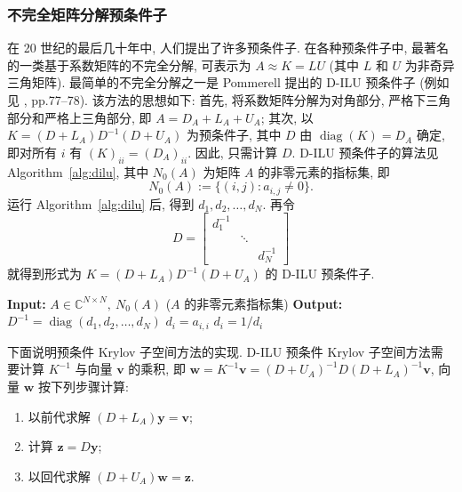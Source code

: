 \subsubsection{{不完全矩阵分解预条件子}}\label{subsec:incomplete-decomposition-preconditioners}
{在 20 世纪的最后几十年中, 人们提出了许多预条件子. 在各种预条件子中, 最著名的一类基于系数矩阵的不完全分解, 可表示为 $A\approx K=LU$ (其中 $L$ 和 $U$ 为非奇异三角矩阵).}
{最简单的不完全分解之一是 Pommerell 提出的 D-ILU 预条件子 (例如见 , pp.77--78). 该方法的思想如下: 首先, 将系数矩阵分解为对角部分, 严格下三角部分和严格上三角部分, 即 $A=D_A+L_A+U_A$; 其次, 以 $K=(D+L_A)D^{-1}(D+U_A)$ 为预条件子, 其中 $D$ 由 $\operatorname{diag}(K)=D_A$ 确定, 即对所有 $i$ 有 $(K)_{ii}=(D_A)_{ii}$. 因此, 只需计算 $D$.}
{D-ILU 预条件子的算法见 Algorithm\ \ref{alg:dilu}, 其中 $N_0(A)$ 为矩阵 $A$ 的非零元素的指标集, 即}
\[N_0(A):=\{(i,j):a_{i,j}\ne0\}.\]
{运行 Algorithm\ \ref{alg:dilu} 后, 得到 $d_1,d_2,\ldots,d_N$. 再令}
\[D=\begin{bmatrix}d_1^{-1}&&\\&\ddots&\\&&d_N^{-1}\end{bmatrix}\]
{就得到形式为 $K=(D+L_A)D^{-1}(D+U_A)$ 的 D-ILU 预条件子.}
\begin{algorithm}[H]\caption{{D-ILU 分解}}\label{alg:dilu}\begin{algorithmic}[1]
\Statex\textbf{Input:} $A\in\mathbb C^{N\times N},\ N_0(A)$ {($A$ 的非零元素指标集)}
\Statex\textbf{Output:} $D^{-1}=\operatorname{diag}(d_1,d_2,\ldots,d_N)$
\State $d_i=a_{i,i}$
\EndFor
{}
\State $d_i=1/d_i$
\EndFor\EndFor\end{algorithmic}\end{algorithm}
{\leavevmode{}\label{idx:chapter-03-section-05:dilu-implementation}下面说明预条件 Krylov 子空间方法的实现. D-ILU 预条件 Krylov 子空间方法需要计算 $K^{-1}$ 与向量 $\bm v$ 的乘积, 即 $\bm w=K^{-1}\bm v=(D+U_A)^{-1}D(D+L_A)^{-1}\bm v$, 向量 $\bm w$ 按下列步骤计算:}
\begin{enumerate}
\item {以前代求解 $(D+L_A)\bm y=\bm v$;}
\item {计算 $\bm z=D\bm y$;}
\item {以回代求解 $(D+U_A)\bm w=\bm z$.}
\end{enumerate}
